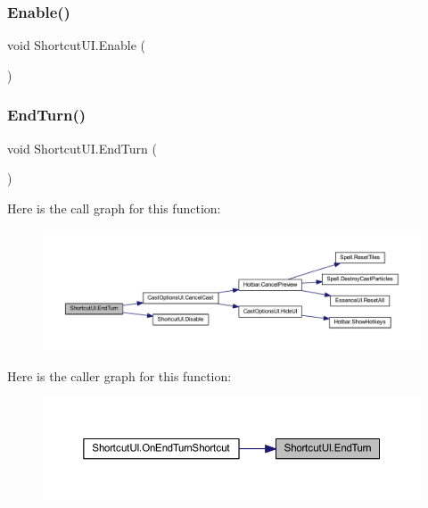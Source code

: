 \subsubsection{\texorpdfstring{Enable()}{Enable()}}
{\footnotesize\ttfamily void Shortcut\+U\+I.\+Enable (\begin{DoxyParamCaption}{ }\end{DoxyParamCaption})}

\mbox{\label{class_shortcut_u_i_ab2181e3a43736c065ce2ff0d8066903e}} 
\subsubsection{\texorpdfstring{EndTurn()}{EndTurn()}}
{\footnotesize\ttfamily void Shortcut\+U\+I.\+End\+Turn (\begin{DoxyParamCaption}{ }\end{DoxyParamCaption})}

Here is the call graph for this function\+:
\nopagebreak
\begin{figure}[H]
\begin{center}
\leavevmode
\includegraphics[width=350pt]{class_shortcut_u_i_ab2181e3a43736c065ce2ff0d8066903e_cgraph}
\end{center}
\end{figure}
Here is the caller graph for this function\+:
\nopagebreak
\begin{figure}[H]
\begin{center}
\leavevmode
\includegraphics[width=350pt]{class_shortcut_u_i_ab2181e3a43736c065ce2ff0d8066903e_icgraph}
\end{center}
\end{figure}
\mbox{\label{class_shortcut_u_i_a2434bf0b041a115161fda12022d69f0b}} 

